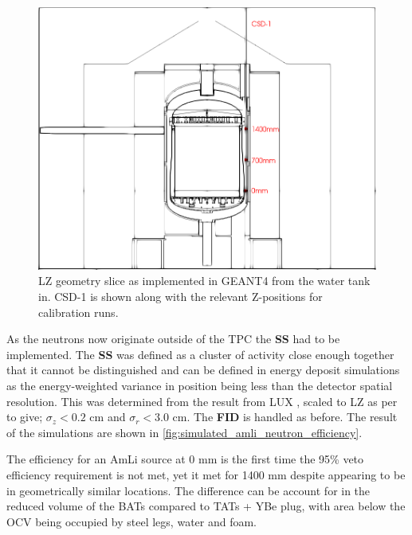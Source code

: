 \begin{figure}[!htbp]
\centering
\includegraphics[width=\textwidth]{Figures/Geometry/csd1_geometry_black_and_white.png}
\caption{LZ geometry slice as implemented in GEANT4 from the water tank in. CSD-1 is shown along with the relevant Z-positions for calibration runs.}
\label{fig:CSD1_Geometry}
\end{figure}


\par
As the neutrons now originate outside of the TPC the \textbf{SS} had to be implemented.
The \textbf{SS} was defined as a cluster of activity close enough together that it cannot be distinguished and can be defined in energy deposit simulations as the energy-weighted variance in position being less than the detector spatial resolution.
This was determined from the result from LUX \cite{lux_position_reconstruction_ref}, scaled to LZ as per \cite{LZ_TechnicalDesignReview_ref} to give; ${\sigma}_{z}<0.2$ cm and ${\sigma}_{r}<3.0$ cm.
The \textbf{FID} is handled as before.
The result of the simulations are shown in \autoref{fig:simulated_amli_neutron_efficiency}.


\par
The efficiency for an AmLi source at 0 mm is the first time the 95\% veto efficiency requirement is not met, yet it met for 1400 mm despite appearing to be in geometrically similar locations.
The difference can be account for in the reduced volume of the BATs compared to TATs + YBe plug, with area below the OCV being occupied by steel legs, water and foam.

